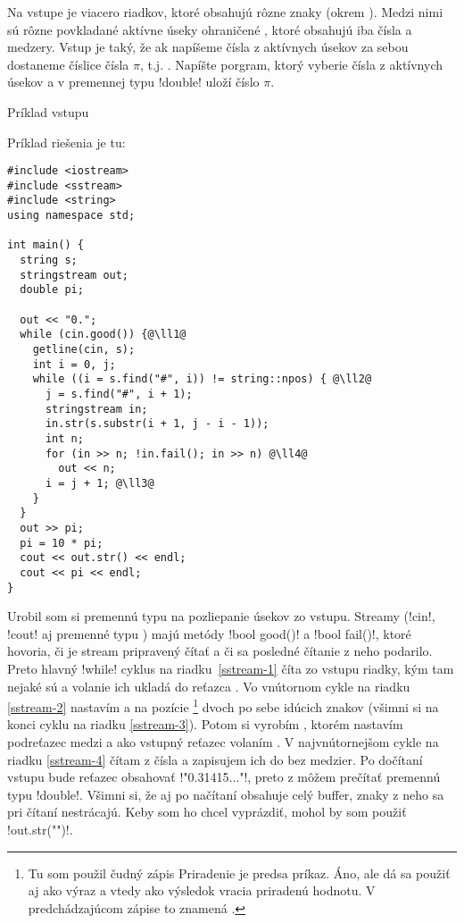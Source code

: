 \begin{uloha}
  Na vstupe je viacero riadkov, ktoré obsahujú rôzne znaky (okrem \vb{\#}).  
  Medzi nimi sú rôzne povkladané aktívne úseky ohraničené \vb{\#}, ktoré obsahujú 
  iba čísla a medzery. Vstup je taký, že ak napíšeme čísla z aktívnych
  úsekov za sebou dostaneme číslice čísla $\pi$, t.j. .
  Napíšte porgram, ktorý vyberie čísla z aktívnych úsekov a v premennej typu \prg!double!
  uloží číslo $\pi$.

 Príklad vstupu

\end{uloha}

Príklad riešenia je tu:

\begin{lstlisting}[label=sstream]
#include <iostream>
#include <sstream>
#include <string>
using namespace std;

int main() {
  string s;
  stringstream out;
  double pi;

  out << "0.";
  while (cin.good()) {@\ll1@
    getline(cin, s);
    int i = 0, j;
    while ((i = s.find("#", i)) != string::npos) { @\ll2@
      j = s.find("#", i + 1);
      stringstream in;
      in.str(s.substr(i + 1, j - i - 1));
      int n;
      for (in >> n; !in.fail(); in >> n) @\ll4@
        out << n;
      i = j + 1; @\ll3@
    }
  }
  out >> pi;
  pi = 10 * pi;
  cout << out.str() << endl;
  cout << pi << endl;
}
\end{lstlisting}

Urobil som si  premennú typu 
na pozliepanie úsekov zo vstupu. Streamy (\prg!cin!, \prg!cout! aj premenné typu 
) majú metódy \prg!bool good()! a \prg!bool fail()!, ktoré
hovoria, či je stream pripravený čítať a či sa posledné čítanie z neho podarilo.
Preto hlavný \prg!while! cyklus na riadku~\ref{sstream-1} číta zo vstupu riadky, kým tam nejaké sú
a volanie  ich ukladá do reťazca .
Vo vnútornom cykle na riadku \ref{sstream-2}  nastavím 
  a   na pozície 
\footnote{
Tu som použil čudný zápis \hbox{}
Priradenie je predsa príkaz. Áno, ale dá sa použiť aj ako výraz a vtedy ako výsledok vracia priradenú hodnotu.
V predchádzajúcom zápise to znamená .
}
dvoch po sebe idúcich znakov \vb{\#} (všimni si  na konci
cyklu na riadku \ref{sstream-3}). Potom
si vyrobím , ktorém nastavím podreťazec
 medzi  a  ako vstupný reťazec 
volaním . V najvnútornejšom cykle na riadku \ref{sstream-4}
čítam z  čísla
a zapisujem ich do  bez medzier. Po dočítaní vstupu
bude reťazec  obsahovať \prg!"0.31415..."!,
preto z  môžem prečítať premennú typu \prg!double!.
Všimni si, že  aj po načítaní obsahuje celý buffer, znaky
z neho sa pri čítaní nestrácajú. Keby som ho chcel vyprázdiť, mohol by som použiť \prg!out.str("")!.

